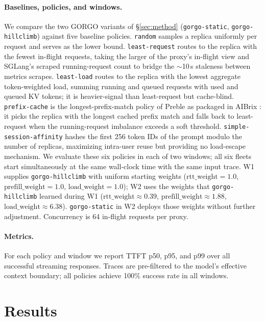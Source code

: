 \documentclass{article}
\begin{document}
\paragraph{Baselines, policies, and windows.}
We compare the two GORGO variants of \S\ref{sec:method}
(\texttt{gorgo-static}, \texttt{gorgo-hillclimb})
against five baseline policies. \texttt{random} samples a replica uniformly per
request and serves as the lower bound. \texttt{least-request} routes to the
replica with the fewest in-flight requests, taking the larger of the proxy's
in-flight view and SGLang's scraped running-request count to bridge the
$\sim$10\,s staleness between metrics scrapes. \texttt{least-load} routes to the
replica with the lowest aggregate token-weighted load, summing running and
queued requests with used and queued KV tokens; it is heavier-signal than
least-request but cache-blind. \texttt{prefix-cache} is the longest-prefix-match policy of Preble
\citep{preble} as packaged in AIBrix \citep{aibrix2024}: it picks the replica
with the longest cached prefix match and falls back to least-request when the
running-request imbalance exceeds a soft threshold. \texttt{simple-session-affinity}
hashes the first 256 token IDs of the prompt modulo the number of replicas,
maximizing intra-user reuse but providing no load-escape mechanism. We evaluate
these six policies in each of two windows; all six fleets start
simultaneously at the same wall-clock time with the same input trace. W1 supplies
\texttt{gorgo-hillclimb} with uniform starting weights
($\mathrm{rtt\_weight}{=}1.0$, $\mathrm{prefill\_weight}{=}1.0$,
$\mathrm{load\_weight}{=}1.0$); W2 uses the weights that
\texttt{gorgo-hillclimb} learned during W1
($\mathrm{rtt\_weight}{\approx}0.39$, $\mathrm{prefill\_weight}{\approx}1.88$,
$\mathrm{load\_weight}{\approx}6.38$). \texttt{gorgo-static} in W2 deploys those
weights without further adjustment. Concurrency is 64 in-flight requests per proxy.

\paragraph{Metrics.}
For each policy and window we report TTFT p50, p95, and p99 over all successful
streaming responses. Traces are pre-filtered to the model's effective context
boundary; all policies achieve 100\% success rate in all windows.

\section{Results}
\end{document}
